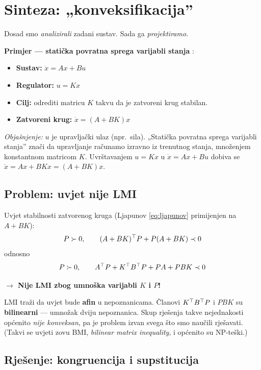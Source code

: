 \section{Sinteza: „konveksifikacija”}
\label{sec:sinteza}

Dosad smo \emph{analizirali} zadani sustav. Sada ga \emph{projektiramo}.

\textbf{Primjer --- statička povratna sprega varijabli stanja} :

\begin{itemize}
  \item \textbf{Sustav:} $\dot x = Ax + Bu$
  \item \textbf{Regulator:} $u = Kx$
  \item \textbf{Cilj:} odrediti matricu $K$ takvu da je zatvoreni krug stabilan.
  \item \textbf{Zatvoreni krug:} $\dot x = (A + BK)x$
\end{itemize}

\emph{Objašnjenje:} $u$ je upravljački ulaz (npr.\ sila). „Statička povratna
sprega varijabli stanja” znači da upravljanje računamo izravno iz trenutnog
stanja, množenjem konstantnom matricom $K$. Uvrštavanjem $u = Kx$ u
$\dot x = Ax + Bu$ dobiva se $\dot x = Ax + BKx = (A+BK)x$. \checkmark

\subsection{Problem: uvjet nije LMI}

Uvjet stabilnosti zatvorenog kruga (Ljapunov \eqref{eq:ljapunov} primijenjen na
$A + BK$):
\[
P \succ 0, \qquad (A + BK)^{\top} P + P(A + BK) \prec 0
\]
odnosno
\[
P \succ 0, \qquad A^{\top} P + K^{\top} B^{\top} P + PA + PBK \prec 0
\]

\textbf{$\to$ Nije LMI zbog umnoška varijabli $K$ i $P$!}

\begin{napomena}
LMI traži da uvjet bude \textbf{afin} u nepoznanicama. Članovi $K^{\top} B^{\top} P$ i
$PBK$ su \textbf{bilinearni} --- umnožak dviju nepoznanica. Skup rješenja takve
nejednakosti općenito \emph{nije konveksan}, pa je problem izvan svega što smo
naučili rješavati. (Takvi se uvjeti zovu BMI, \emph{bilinear matrix
inequality}, i općenito su NP-teški.)
\end{napomena}

\subsection{Rješenje: kongruencija i supstitucija}

